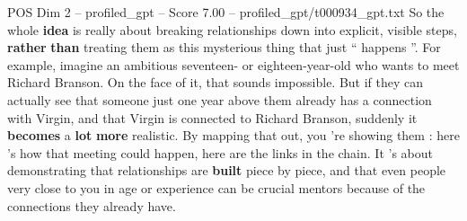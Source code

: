 \begin{textsample}{POS Dim 2 – profiled\_gpt – Score 7.00 – profiled\_gpt/t000934\_gpt.txt}  \label{ex:f2_pos_009}
So the whole \textbf{idea} is really about breaking relationships down into explicit, visible steps, \textbf{rather} \textbf{than} treating them as this mysterious thing that just “ happens ”.
For example, imagine an ambitious seventeen- or eighteen-year-old who wants to meet Richard Branson.
On the face of it, that sounds impossible.
But if they can actually see that someone just one year above them already has a connection with Virgin, and that Virgin is connected to Richard Branson, suddenly it \textbf{becomes} a \textbf{lot} \textbf{more} realistic.
By mapping that out, you ’re showing them : here ’s how that meeting could happen, here are the links in the chain.
It ’s about demonstrating that relationships are \textbf{built} piece by piece, and that even people very close to you in age or experience can be crucial mentors because of the connections they already have.

\end{textsample}
